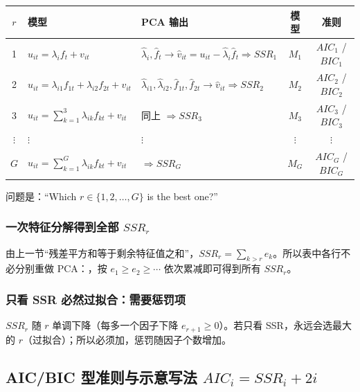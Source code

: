 \begin{center}
\small
\begin{tabularx}{\linewidth}{clLcc}
\toprule
$r$ & 模型 & PCA 输出 & 模型 & 准则\\
 & $u_{it}=\lambda_if_t+v_{it}$ & $\hat\lambda_i,\hat f_t\to\hat v_{it}=u_{it}-\hat\lambda_i\hat f_t\Rightarrow SSR_1$ & $M_1$ & $AIC_1$ / $BIC_1$\\
2 & $u_{it}=\lambda_{i1}f_{1t}+\lambda_{i2}f_{2t}+v_{it}$ & $\hat\lambda_{i1},\hat\lambda_{i2},\hat f_{1t},\hat f_{2t}\to\hat v_{it}\Rightarrow SSR_2$ & $M_2$ & $AIC_2$ / $BIC_2$\\
3 & $u_{it}=\sum_{k=1}^3\lambda_{ik}f_{kt}+v_{it}$ & 同上 $\Rightarrow SSR_3$ & $M_3$ & $AIC_3$ / $BIC_3$\\
$\vdots$ & $\vdots$ & $\vdots$ & $\vdots$ & $\vdots$\\
$G$ & $u_{it}=\sum_{k=1}^G\lambda_{ik}f_{kt}+v_{it}$ & $\Rightarrow SSR_G$ & $M_G$ & $AIC_G$ / $BIC_G$\\
\bottomrule
\end{tabularx}
\label{tab:U13b-select}
\end{center}

问题是：“Which $r\in\{1,2,\dots,G\}$ is the best one?”

\subsubsection{一次特征分解得到全部 \texorpdfstring{$SSR_r$}{SSR\_r}}

由上一节“残差平方和等于剩余特征值之和”，$SSR_r=\sum_{k>r}e_k$。所以表中各行不必分别重做 PCA：，按 $e_1\ge e_2\ge\cdots$ 依次累减即可得到所有 $SSR_r$。

\subsubsection{只看 SSR 必然过拟合：需要惩罚项}

$SSR_r$ 随 $r$ 单调下降（每多一个因子下降 $e_{r+1}\ge0$）。若只看 SSR，永远会选最大的 $r$（过拟合）；所以必须加，惩罚随因子个数增加。

\subsection{AIC/BIC 型准则与示意写法 \texorpdfstring{$AIC_i=SSR_i+2i$}{AIC\_i = SSR\_i + 2i}}

